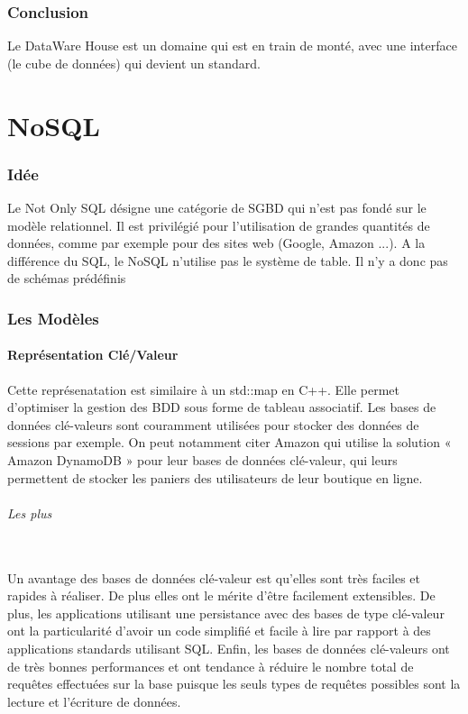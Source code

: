 \documentclass[a4paper,11pt]{article}
\begin{document}
		\section{Conclusion}
		
		Le DataWare House est un domaine qui est en train de monté, avec une interface (le cube de données) qui devient un standard.
				
\part{NoSQL}
	\section{Idée}			
		Le \og{}Not Only SQL\fg{} désigne une catégorie de \textsc{SGBD} qui n'est pas fondé sur le modèle relationnel. Il est privilégié pour l'utilisation de grandes quantités de données, comme par exemple pour des sites web (Google, Amazon ...). A la différence du SQL, le NoSQL n'utilise pas le système de table. Il n'y a donc pas de schémas prédéfinis
	~\\

	\section{Les Modèles}
		\subsection{Représentation Clé/Valeur}
		Cette représenatation est similaire à un \og{}std::map\fg{} en C++. Elle permet d'optimiser la gestion des BDD sous forme de tableau associatif. Les bases de données clé-valeurs sont couramment utilisées pour stocker des données de sessions par exemple. On peut notamment citer Amazon qui utilise la solution « Amazon DynamoDB » pour leur bases de données clé-valeur, qui leurs permettent de stocker les paniers des utilisateurs de leur boutique en ligne.
		
		\paragraph{Les plus}~\\

		Un avantage des bases de données clé-valeur est qu'elles sont très faciles et rapides à réaliser. De plus elles ont le mérite d’être facilement extensibles.	De plus, les applications utilisant une persistance avec des bases de type clé-valeur ont la particularité d'avoir un code simplifié et facile à lire par rapport à des applications standards utilisant SQL. Enfin, les bases de données clé-valeurs ont de très bonnes performances et ont tendance à réduire le nombre total de requêtes effectuées sur la base puisque les seuls types de requêtes possibles sont la 
lecture et l'écriture de données.
		
\end{document}
